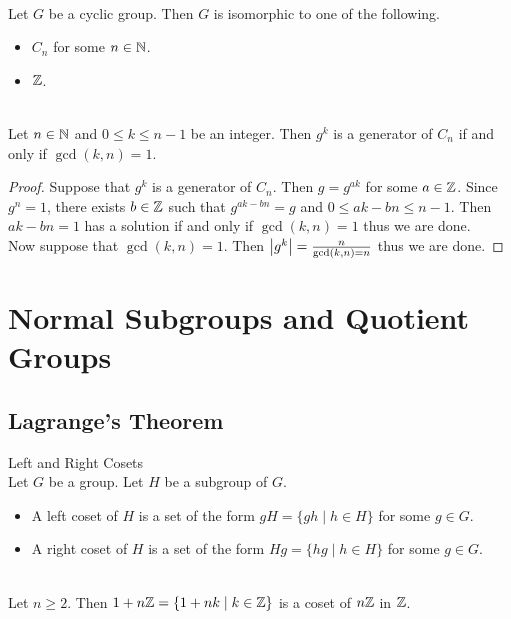 \documentclass[a4paper]{article}
\begin{document}
\begin{lmm}{}{}\\
Let $G$ be a cyclic group. Then $G$ is isomorphic to one of the following. 
\begin{itemize}
\item $C_n$ for some $n\in\mathbb{N}$. 
\item $\mathbb{Z}$. 
\end{itemize}
\end{lmm}

\begin{prp}{}{}\\
Let $n\in\mathbb{N}$ and $0\leq k\leq n-1$ be an integer. Then $g^k$ is a generator of $C_n$ if and only if $\gcd(k,n)=1$. 
\begin{proof}
Suppose that $g^k$ is a generator of $C_n$. Then $g=g^{ak}$ for some $a\in\mathbb{Z}$. Since $g^n=1$, there exists $b\in\mathbb{Z}$ such that $g^{ak-bn}=g$ and $0\leq ak-bn\leq n-1$. Then $ak-bn=1$ has a solution if and only if $\gcd(k,n)=1$ thus we are done. \\
Now suppose that $\gcd(k,n)=1$. Then $\abs{g^k}=\frac{n}{\gcd(k,n)=n}$ thus we are done. 
\end{proof}
\end{prp}

\pagebreak
\section{Normal Subgroups and Quotient Groups}
\subsection{Lagrange's Theorem}
\begin{defn}{Left and Right Cosets}{}\\
Let $G$ be a group. Let $H$ be a subgroup of $G$. 
\begin{itemize}
\item A left coset of $H$ is a set of the form $gH=\{gh\;|\;h\in H\}$ for some $g\in G$. 
\item A right coset of $H$ is a set of the form $Hg=\{hg\;|\;h\in H\}$ for some $g\in G$. 
\end{itemize}
\end{defn}

\begin{eg}{}{}\\
Let $n\geq 2$. Then $1+n\mathbb{Z}=\{1+nk\;|\;k\in\mathbb{Z}\}$ is a coset of $n\mathbb{Z}$ in $\mathbb{Z}$. 
\end{eg}
\end{document}
